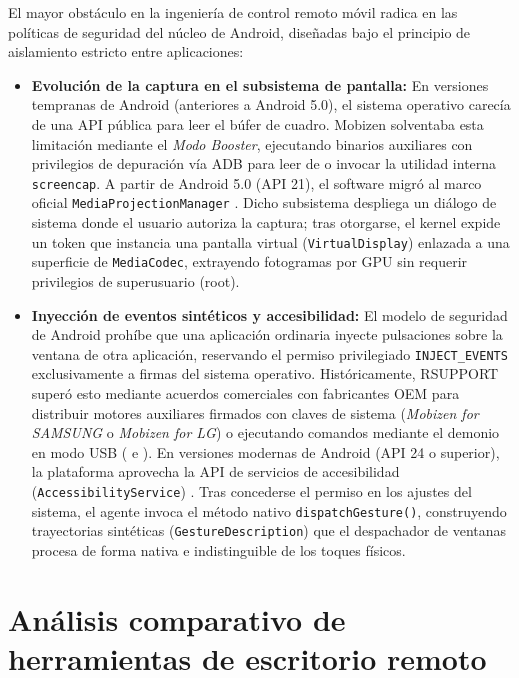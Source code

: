 \documentclass[12pt]{article}
\begin{document}
El mayor obstáculo en la ingeniería de control remoto móvil radica en las políticas de seguridad del núcleo de Android, diseñadas bajo el principio de aislamiento estricto entre aplicaciones:
\begin{itemize}[noitemsep, topsep=4pt]
    \item \textbf{Evolución de la captura en el subsistema de pantalla:} En versiones tempranas de Android (anteriores a Android 5.0), el sistema operativo carecía de una API pública para leer el búfer de cuadro. Mobizen solventaba esta limitación mediante el \textit{Modo Booster}, ejecutando binarios auxiliares con privilegios de depuración vía ADB para leer de  o invocar la utilidad interna \texttt{screencap}. A partir de Android 5.0 (API 21), el software migró al marco oficial \texttt{MediaProjection}\allowbreak\texttt{Manager} \parencite{androidMediaProjection}. Dicho subsistema despliega un diálogo de sistema donde el usuario autoriza la captura; tras otorgarse, el kernel expide un token que instancia una pantalla virtual (\texttt{VirtualDisplay}) enlazada a una superficie de \texttt{MediaCodec}, extrayendo fotogramas por GPU sin requerir privilegios de superusuario (root).
    \item \textbf{Inyección de eventos sintéticos y accesibilidad:} El modelo de seguridad de Android prohíbe que una aplicación ordinaria inyecte pulsaciones sobre la ventana de otra aplicación, reservando el permiso privilegiado \texttt{INJECT\_}\allowbreak\texttt{EVENTS} exclusivamente a firmas del sistema operativo. Históricamente, RSUPPORT superó esto mediante acuerdos comerciales con fabricantes OEM para distribuir motores auxiliares firmados con claves de sistema (\textit{Mobizen for SAMSUNG} o \textit{Mobizen for LG}) o ejecutando comandos mediante el demonio  en modo USB ( e ). En versiones modernas de Android (API 24 o superior), la plataforma aprovecha la API de servicios de accesibilidad (\texttt{Accessibility}\allowbreak\texttt{Service}) \parencite{androidAccessibilityGesture}. Tras concederse el permiso en los ajustes del sistema, el agente invoca el método nativo \texttt{dispatch}\allowbreak\texttt{Gesture()}, construyendo trayectorias sintéticas (\texttt{Gesture}\allowbreak\texttt{Description}) que el despachador de ventanas procesa de forma nativa e indistinguible de los toques físicos.
\end{itemize}

\section{Análisis comparativo de herramientas de escritorio remoto}\label{sec:analisisComparativo}
\end{document}
